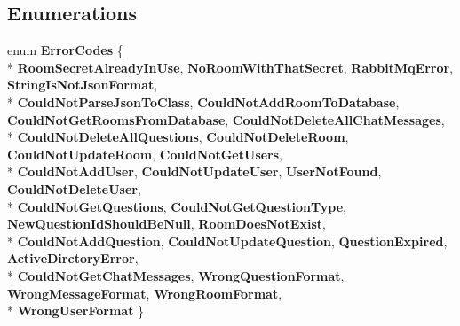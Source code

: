 \subsection*{Enumerations}
\begin{DoxyCompactItemize}
\item 
\hypertarget{namespace_wis_r_rest_a_p_i_a44a24dac7df310f7a1bb70f11eaebd89}{}enum {\bfseries Error\+Codes} \{ \\*
{\bfseries Room\+Secret\+Already\+In\+Use}, 
{\bfseries No\+Room\+With\+That\+Secret}, 
{\bfseries Rabbit\+Mq\+Error}, 
{\bfseries String\+Is\+Not\+Json\+Format}, 
\\*
{\bfseries Could\+Not\+Parse\+Json\+To\+Class}, 
{\bfseries Could\+Not\+Add\+Room\+To\+Database}, 
{\bfseries Could\+Not\+Get\+Rooms\+From\+Database}, 
{\bfseries Could\+Not\+Delete\+All\+Chat\+Messages}, 
\\*
{\bfseries Could\+Not\+Delete\+All\+Questions}, 
{\bfseries Could\+Not\+Delete\+Room}, 
{\bfseries Could\+Not\+Update\+Room}, 
{\bfseries Could\+Not\+Get\+Users}, 
\\*
{\bfseries Could\+Not\+Add\+User}, 
{\bfseries Could\+Not\+Update\+User}, 
{\bfseries User\+Not\+Found}, 
{\bfseries Could\+Not\+Delete\+User}, 
\\*
{\bfseries Could\+Not\+Get\+Questions}, 
{\bfseries Could\+Not\+Get\+Question\+Type}, 
{\bfseries New\+Question\+Id\+Should\+Be\+Null}, 
{\bfseries Room\+Does\+Not\+Exist}, 
\\*
{\bfseries Could\+Not\+Add\+Question}, 
{\bfseries Could\+Not\+Update\+Question}, 
{\bfseries Question\+Expired}, 
{\bfseries Active\+Dirctory\+Error}, 
\\*
{\bfseries Could\+Not\+Get\+Chat\+Messages}, 
{\bfseries Wrong\+Question\+Format}, 
{\bfseries Wrong\+Message\+Format}, 
{\bfseries Wrong\+Room\+Format}, 
\\*
{\bfseries Wrong\+User\+Format}
 \}\label{namespace_wis_r_rest_a_p_i_a44a24dac7df310f7a1bb70f11eaebd89}

\end{DoxyCompactItemize}
